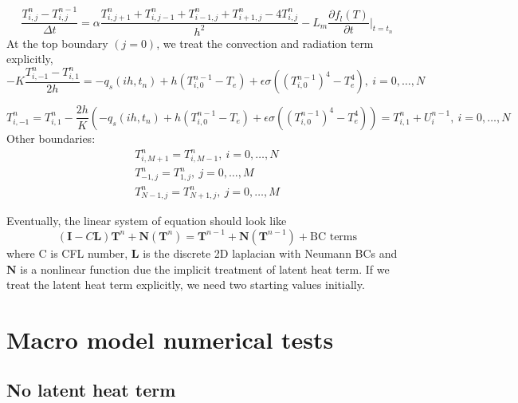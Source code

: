 \documentclass[a4paper,12pt]{article}
\newcommand{\B}[1]{\mathbf{#1}}
\newcommand{\yxb}[1]{  {\bf \color{red}{ Bao: #1}} }
\begin{document}
\begin{equation}
\frac{T_{i,j}^n - T_{i,j}^{n-1}}{\Delta t} = \alpha \frac{T_{i,j+1}^n + T_{i,j-1}^n + T_{i-1,j}^n + T_{i+1,j}^n - 4 T_{i,j}^n }{h^2} - L_m \frac{\partial f_l(T) }{\partial t} \bigg|_{t = t_n}
\end{equation}
At the top boundary $(j=0)$, we treat the convection and radiation term explicitly,
\begin{equation}
-K \frac{T_{i, -1}^n - T_{i,1}^n}{2h} = -q_s (ih, t_n) + h (T^{n-1}_{i,0} - T_e) + \epsilon \sigma ( (T^{n-1}_{i,0})^4 - T_e^4), \ i = 0 , \dots , N
\end{equation}

\begin{equation}
T_{i, -1}^n = T_{i,1}^n -\frac{2h}{K}\left(-q_s (ih, t_n) + h (T^{n-1}_{i,0} - T_e) + \epsilon \sigma ( (T^{n-1}_{i,0})^4 - T_e^4)\right)=T_{i,1}^n+U_i^{n-1}, \ i = 0 , \dots , N
\end{equation}
Other boundaries:
\begin{align}
T_{i, M+1}^n =T_{i,M-1}^n, \ i = 0 , \dots , N\\
T_{-1, j}^n =T_{1,j}^n, \ j = 0 , \dots ,M\\
T_{N-1, j}^n =T_{N+1,j}^n, \ j = 0 , \dots ,M
\end{align}

Eventually, the linear system of equation should look like 
\begin{equation}
(\B{I} - C\B{L} ) \B{T}^n + \B{N} (\B{T}^n) = \B{T}^{n-1} +\B{N} (\B{T}^{n-1})+ \text{BC terms}
\end{equation}
where C is CFL number, $\B{L}$ is the discrete 2D laplacian with Neumann BCs and $\B{N}$ is a nonlinear function due the implicit treatment of latent heat term. If we treat the latent heat term explicitly, we need two starting values initially. 


\section{Macro model numerical tests}

\subsection{No latent heat term}
\end{document}
